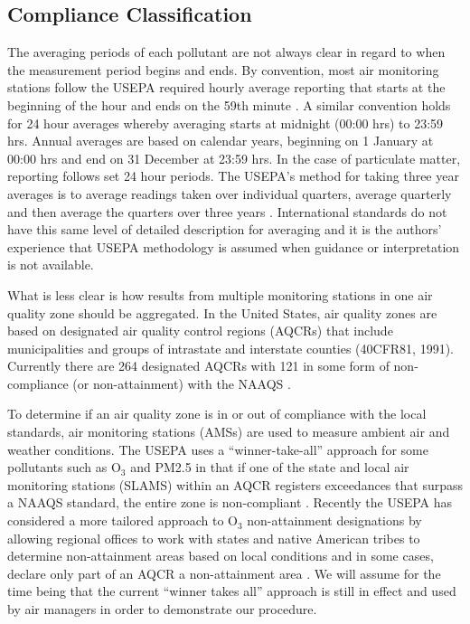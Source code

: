 \subsection{Compliance Classification}

The averaging periods of each pollutant are not always clear in regard to when the measurement period begins and ends.  By convention, most air monitoring stations follow the USEPA required hourly average reporting that starts at the beginning of the hour and ends on the 59th minute \citep{CAA2007}.  A similar convention holds for 24 hour averages whereby averaging starts at midnight (00:00 hrs) to 23:59 hrs. Annual averages are based on calendar years, beginning on 1 January at 00:00 hrs and end on 31 December at 23:59 hrs.  In the case of particulate matter, reporting follows set 24 hour periods.  The USEPA’s method for taking three year averages is to average readings taken over individual quarters, average quarterly and then average the quarters over three years \citep{Cohen1999}. International standards do not have this same level of detailed description for averaging and it is the authors’ experience that USEPA methodology is assumed when guidance or interpretation is not available.

What is less clear is how results from multiple monitoring stations in one air quality zone should be aggregated. In the United States, air quality zones are based on designated air quality control regions (AQCRs) that include municipalities and groups of intrastate and interstate counties (40CFR81, 1991). Currently there are 264 designated AQCRs with 121 in some form of non-compliance (or non-attainment) with the NAAQS \citep{USEPA2016b}. 

To determine if an air quality zone is in or out of compliance with the local standards, air monitoring stations (AMSs) are used to measure ambient air and weather conditions. The USEPA uses a ``winner-take-all” approach for some pollutants such as O$_{3}$ and PM2.5 in that if one of the state and local air monitoring stations (SLAMS) within an AQCR registers exceedances that surpass a NAAQS standard, the entire zone is non-compliant \citep{USEPA2005a}.  Recently the USEPA has considered a more tailored approach to O$_{3}$ non-attainment designations by allowing regional offices to work with states and native American tribes to determine non-attainment areas based on local conditions and in some cases, declare only part of an AQCR a non-attainment area \citep{McCabe2015}. We will assume for the time being that the current ``winner takes all” approach is still in effect and used by air managers in order to demonstrate our procedure.


